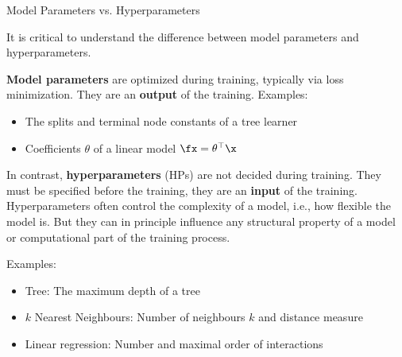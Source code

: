 


\begin{frame}{Model Parameters vs. Hyperparameters}

It is critical to understand the difference between model parameters and hyperparameters.

\vspace{0.5cm}

\textbf{Model parameters} are optimized during training, typically via loss minimization. They are an \textbf{output} of the training. Examples:
\begin{itemize}
\item The splits and terminal node constants of a tree learner
\item Coefficients $\theta$ of a linear model $\fx = \theta^\top\x$
\end{itemize}

\framebreak

In contrast, \textbf{hyperparameters} (HPs) are not decided during training. They must be specified before the training, they are an \textbf{input} of the training.
Hyperparameters often control the complexity of a model, i.e., how flexible the model is.
But they can in principle influence any structural property of a model or computational part of the training process.

\vspace{0.5cm}

Examples:

\begin{itemize}
\item Tree: The maximum depth of a tree
\item $k$ Nearest Neighbours: Number of neighbours $k$ and distance measure
\item Linear regression: Number and maximal order of interactions
\end{itemize}

\end{frame}


